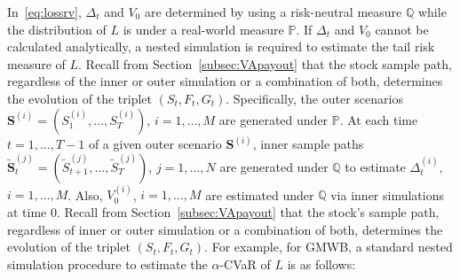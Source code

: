 \documentclass[]{article}
\newcommand{\bS}{\bm{S}}
\newcommand{\bStilde}{\widetilde{\bm{S}}}
\newcommand{\Stilde}{\widetilde{S}}
\begin{document}
In~\eqref{eq:lossrv}, $\Delta_t$ and $V_0$ are determined by using a risk-neutral measure $\mathbb{Q}$ while the distribution of $L$ is under a real-world measure $\mathbb{P}$.
If $\Delta_t$ and $V_0$ cannot be calculated analytically, a nested simulation is required to estimate the tail risk measure of $L$.
Recall from Section~\ref{subsec:VApayout} that the stock sample path, regardless of the inner or outer simulation or a combination of both, determines the evolution of the triplet $(S_t,F_t,G_t)$.
Specifically, the outer scenarios $\bS^{(i)} = (S_{1}^{(i)},\ldots,S_{T}^{(i)})$, $i=1,\ldots,M$ are generated under $\mathbb{P}$.
At each time~$t=1,\ldots,T-1$ of a given outer scenario $\bS^{(i)}$, inner sample paths $\bStilde_{t}^{(j)} = (\Stilde_{t+1}^{(j)},\ldots,\Stilde_{T}^{(j)})$, $j=1,\ldots,N$ are generated under $\mathbb{Q}$ to estimate $\Delta_t^{(i)}$, $i=1,\ldots,M$.
Also, $V_0^{(i)}$, $i=1,\ldots,M$ are estimated under $\mathbb{Q}$ via inner simulations at time $0$.
Recall from Section~\ref{subsec:VApayout} that the stock's sample path, regardless of inner or outer simulation or a combination of both, determines the evolution of the triplet $(S_t,F_t,G_t)$.
For example, for GMWB, a standard nested simulation procedure to estimate the $\alpha$-CVaR of $L$ is as follows:
\end{document}
